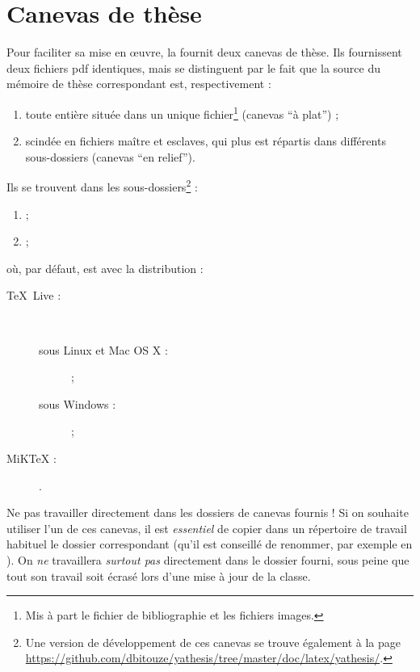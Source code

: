 \chapter{Canevas de thèse}\label{cha:canevas}

Pour faciliter sa mise en œuvre, la \yatcl fournit deux canevas de thèse. Ils
fournissent deux fichiers \gls{pdf} identiques, mais se distinguent par le fait
que la source  du mémoire de thèse correspondant est,
respectivement :
\begin{enumerate}
\item toute entière située dans un unique fichier\footnote{Mis à part le
    fichier de bibliographie et les fichiers images.} (canevas \enquote{à
    plat}) ;
\item scindée en fichiers maître et esclaves, qui plus est répartis dans
  différents sous-dossiers (canevas \enquote{en relief}).
\end{enumerate}
Ils se trouvent dans les sous-dossiers\footnote{Une version de
  développement de ces canevas se trouve également à la page
  \url{https://github.com/dbitouze/yathesis/tree/master/doc/latex/yathesis/}.} :
\begin{enumerate}
\item {} ;
\item {} ;
\end{enumerate}
où, par défaut,  est avec la distribution :
\begin{description}
\item[\TeX{}~Live :]\
  \begin{description}
  \item[sous Linux et Mac OS X :] \unixtldirectory\tldistdirectory\versiontl ;
  \item[sous Windows :] \wintldirectory\tldistdirectory\versiontl ;
  \end{description}
\item[MiK\TeX{} :] \miktexdistdirectory.
\end{description}

\begin{dbwarning}{Ne pas travailler directement dans les dossiers de canevas
    fournis !}{}
  Si on souhaite utiliser l'un de ces canevas, il est \emph{essentiel} de
  copier dans un répertoire de travail habituel le dossier correspondant (qu'il
  est conseillé de renommer, par exemple en \directory{these}). On \emph{ne}
  travaillera \emph{surtout pas} directement dans le dossier fourni, sous peine
  que tout son travail soit écrasé lors d'une mise à jour de la classe.
\end{dbwarning}

